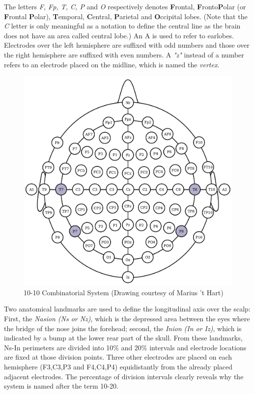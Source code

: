 \documentclass[12pt]{article}
\numberwithin{equation}{section}
\numberwithin{figure}{section}
\numberwithin{table}{section}
\begin{document}
\par{
    The letters \emph{F, Fp, T, C, P} and \emph{O} respectively denotes \textbf{F}rontal, \textbf{F}ronto\textbf{P}olar
    (or \textbf{F}rontal \textbf{P}olar), \textbf{T}emporal, \textbf{C}entral, \textbf{P}arietal and
    \textbf{O}ccipital lobes. (Note that the \emph{C} letter is only meaningful as a notation to define the central line
    as the brain does not have an area called central lobe.) An A is used to refer to earlobes.
    Electrodes over the left hemisphere are suffixed with odd numbers and those over the right hemisphere
    are suffixed with even numbers. A \emph{"z"} instead of a number refers to an electrode placed on the midline, which
    is named the \emph{vertex}.

    \begin{figure}[ht]
        \centering
        \includegraphics[scale=0.6]{images/10_20_extended}
        \caption[10-10 Combinatorial System]{10-10 Combinatorial System (Drawing courtesy of Marius 't Hart)}
        \label{fig:eeg_1020_comb}
    \end{figure}
}

\par{
    Two anatomical landmarks are used to define the longitudinal axis over the scalp: First, the \emph{Nasion (Ns or Nz)}, which is the
    depressed area between the eyes where the bridge of the nose joins the forehead; second, the \emph{Inion (In or Iz)}, which is
    indicated by a bump at the lower rear part of the skull. From these landmarks, Ns-In perimeters are divided into 10\% and 20\% intervals
    and electrode locations are fixed at those division points. Three other electrodes are placed on each hemisphere
    (F3,C3,P3 and F4,C4,P4) equidistantly from the already placed adjacent electrodes. The percentage of division intervals
    clearly reveals why the system is named after the term 10-20.
}
\end{document}
